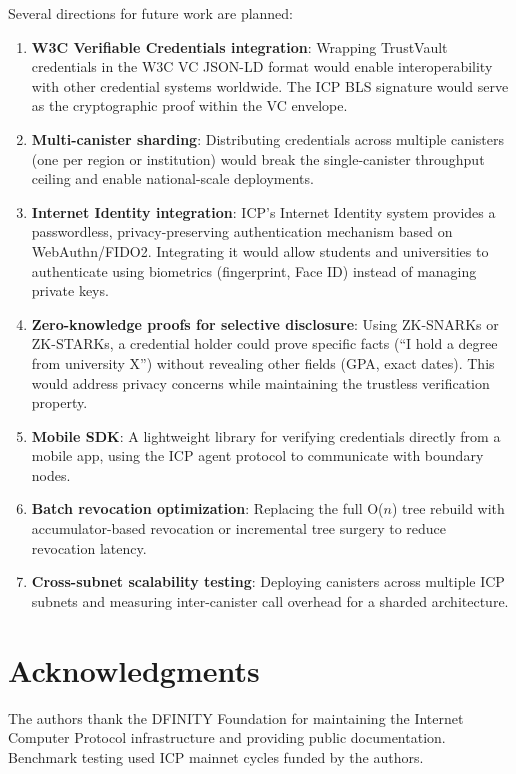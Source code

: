 \documentclass[conference]{IEEEtran}
\begin{document}
Several directions for future work are planned:

\begin{enumerate}
  \item \textbf{W3C Verifiable Credentials integration}: Wrapping TrustVault credentials in the W3C VC JSON-LD format would enable interoperability with other credential systems worldwide. The ICP BLS signature would serve as the cryptographic proof within the VC envelope.
  \item \textbf{Multi-canister sharding}: Distributing credentials across multiple canisters (one per region or institution) would break the single-canister throughput ceiling and enable national-scale deployments.
  \item \textbf{Internet Identity integration}: ICP's Internet Identity system provides a passwordless, privacy-preserving authentication mechanism based on WebAuthn/FIDO2. Integrating it would allow students and universities to authenticate using biometrics (fingerprint, Face ID) instead of managing private keys.
  \item \textbf{Zero-knowledge proofs for selective disclosure}: Using ZK-SNARKs or ZK-STARKs, a credential holder could prove specific facts (``I hold a degree from university X'') without revealing other fields (GPA, exact dates). This would address privacy concerns while maintaining the trustless verification property.
  \item \textbf{Mobile SDK}: A lightweight library for verifying credentials directly from a mobile app, using the ICP agent protocol to communicate with boundary nodes.
  \item \textbf{Batch revocation optimization}: Replacing the full O($n$) tree rebuild with accumulator-based revocation or incremental tree surgery to reduce revocation latency.
  \item \textbf{Cross-subnet scalability testing}: Deploying canisters across multiple ICP subnets and measuring inter-canister call overhead for a sharded architecture.
\end{enumerate}

\section*{Acknowledgments}
The authors thank the DFINITY Foundation for maintaining the Internet Computer Protocol infrastructure and providing public documentation. Benchmark testing used ICP mainnet cycles funded by the authors.
\end{document}
